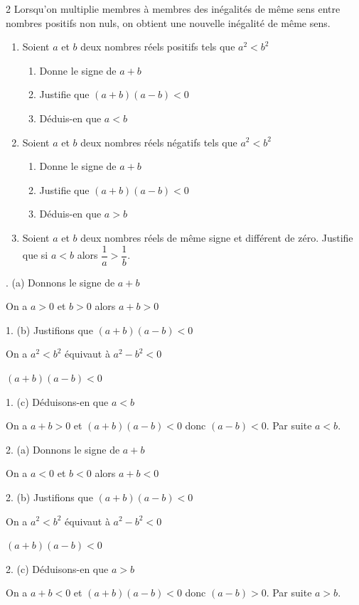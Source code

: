 \begin{multicols*}{2}
{  		 Lorsqu'on multiplie membres à membres des inégalités de même sens entre nombres positifs non nuls, on obtient une nouvelle inégalité de même sens.  
  	}
  	\begin{enumerate}
  		\item Soient $a$ et $b$ deux nombres réels positifs tels que $a^2<b^2$
  		\begin{enumerate}
  			\item  Donne le signe de $a+b$
  			\item Justifie que $(a+b)(a-b)<0$
  			\item Déduis-en que $a<b$		
  		\end{enumerate}	
  		\item Soient $a$ et $b$ deux nombres réels négatifs tels que $a^2<b^2$
  		\begin{enumerate}
  			\item  Donne le signe de $a+b$
  			\item Justifie que $(a+b)(a-b)<0$
  			\item Déduis-en que $a>b$		
  		\end{enumerate}	
  		
  		\item Soient $a$ et $b$ deux nombres réels de même signe et différent de zéro. Justifie que si $a< b$ alors $\dfrac{1}{a}> \dfrac{1}{b}$.
  	\end{enumerate}
  	\dure
  	. (a)  Donnons le signe de $a+b$
  	
  	On a $a>0$ et $b>0$ alors $a+b>0$
  	
  	1. (b) Justifions que $(a+b)(a-b)<0$
  	
  	On a $a^2<b^2$ équivaut à $a^2-b^2<0$
  	
  	$(a+b)(a-b)<0$ 
  	
  	1. (c) Déduisons-en que $a<b$
  	
  	On a $a+b>0$ et $(a+b)(a-b)<0$  donc $(a-b)<0$. Par suite $a<b$.
  	
  	2. (a) Donnons le signe de $a+b$
  	
  	On a $a<0$ et $b<0$ alors $a+b<0$
  	
  	2. (b) Justifions que $(a+b)(a-b)<0$
  	
  	On a $a^2<b^2$ équivaut à $a^2-b^2<0$
  	
  	$(a+b)(a-b)<0$
  	
  	2. (c) Déduisons-en que $a>b$
  	
  	On a $a+b<0$ et $(a+b)(a-b)<0$  donc $(a-b)>0$. Par suite $a>b$.
  	

\end{multicols*}
